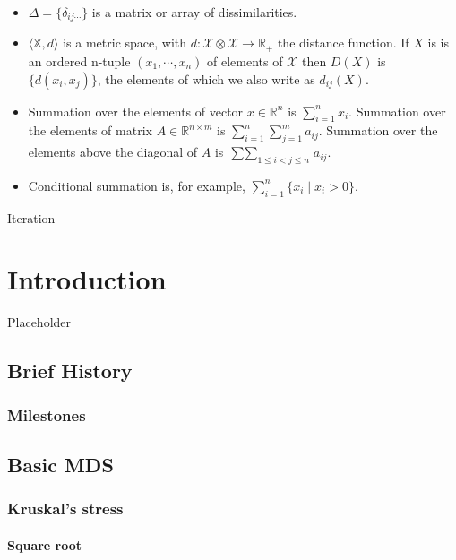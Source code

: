 \documentclass[
  12pt,
]{book}
\begin{document}
\begin{itemize}
\item
  \(\Delta=\{\delta_{ij\cdots}\}\) is a matrix or array of dissimilarities.
\item
  \(\langle \mathbb{X},d\rangle\) is a metric space, with \(d:\mathcal{X}\otimes\mathcal{X}\rightarrow\mathbb{R}_+\) the distance function. If \(X\) is is an ordered n-tuple \((x_1,\cdots,x_n)\) of elements of \(\mathcal{X}\) then \(D(X)\) is \(\{d(x_i,x_j)\}\), the elements of which we also write as \(d_{ij}(X)\).
\item
  Summation over the elements of vector \(x\in\mathbb{R}^n\) is \(\sum_{i=1}^n x_i\). Summation over the elements of matrix \(A\in\mathbb{R}^{n\times m}\) is \(\sum_{i=1}^n\sum_{j=1}^m a_{ij}\).
  Summation over the elements above the diagonal of \(A\) is
  \(\mathop{\sum\sum}_{1\leq i<j\leq n}a_{ij}\).
\item
  Conditional summation is, for example, \(\sum_{i=1}^n \{x_i\mid x_i>0\}\).
\end{itemize}

Iteration

\chapter{Introduction}\label{intro}

Placeholder

\section{Brief History}\label{introhist}

\subsection{Milestones}\label{milestones}

\section{Basic MDS}\label{introbasic}

\subsection{Kruskal's stress}\label{kruskals-stress}

\subsubsection{Square root}\label{square-root}
\end{document}
